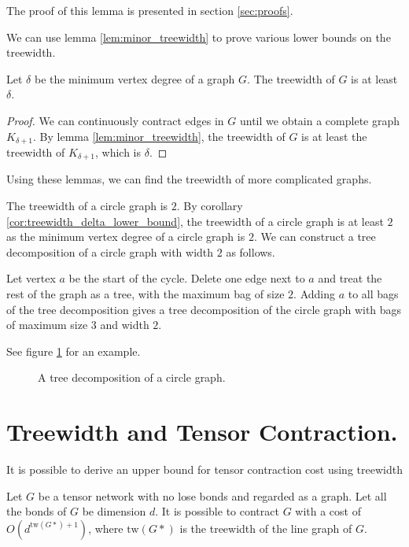 The proof of this lemma is presented in section \ref{sec:proofs}.

We can use lemma \ref{lem:minor_treewidth} to prove various lower bounds on the treewidth. 

\begin{corollary}\label{cor:treewidth_delta_lower_bound}
	Let $\delta$ be the minimum vertex degree of a graph $G$. The treewidth of $G$ is at least $\delta$.
\end{corollary}

\begin{proof}
	We can continuously contract edges in $G$ until we obtain a complete graph $K_{\delta + 1}$. By lemma \ref{lem:minor_treewidth}, the treewidth of $G$ is at least the treewidth of $K_{\delta + 1}$, which is $\delta$.
\end{proof}

Using these lemmas, we can find the treewidth of more complicated graphs.

\begin{example}
	The treewidth of a circle graph is $2$.
	By corollary \ref{cor:treewidth_delta_lower_bound}, the treewidth of a circle graph is at least $2$ as the minimum vertex degree of a circle graph is $2$.
	We can construct a tree decomposition of a circle graph with width $2$ as follows.

	Let vertex $a$ be the start of the cycle. Delete one edge next to $a$ and treat the rest of the graph as a tree, with the maximum bag of size $2$.
	Adding $a$ to all bags of the tree decomposition gives a tree decomposition of the circle graph with bags of maximum size $3$ and width $2$.

	See figure \ref{fig:tree_decomposition_of_circle_graph} for an example.
\end{example}

\begin{figure}[ht]
	\centering
	
	\caption{A tree decomposition of a circle graph.}
	\label{fig:tree_decomposition_of_circle_graph}
\end{figure}


\section{Treewidth and Tensor Contraction.}

It is possible to derive an upper bound for tensor contraction cost using treewidth

\begin{theorem}\label{thm:treewidth_tensor_contraction} 
	Let $G$ be a tensor network with no lose bonds and regarded as a graph. 
	Let all the bonds of $G$ be dimension $d$.
	It is possible to contract $G$ with a cost of $O(d^{\text{tw}(G*) + 1})$, where $\text{tw}(G*)$ is the treewidth of the line graph of $G$.
\end{theorem}

